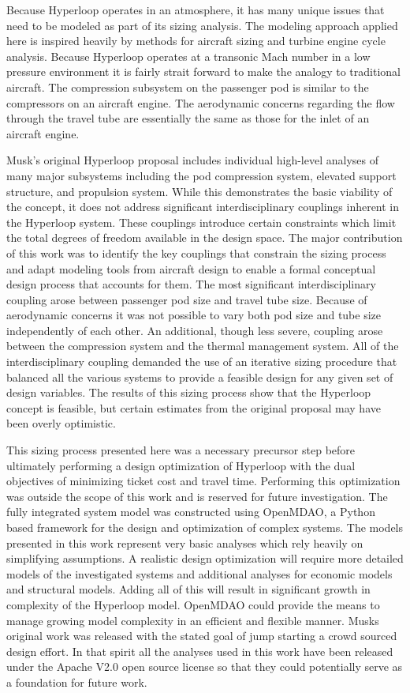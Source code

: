 \documentclass[heading.tex]{subfiles}
\begin{document}
Because Hyperloop operates in an atmosphere, it has many unique issues that need to be modeled as part of its sizing analysis. 
The modeling approach applied here is inspired heavily by methods for aircraft sizing and turbine engine cycle analysis. Because Hyperloop 
operates at a transonic Mach number in a low pressure environment it is fairly strait forward to make the analogy to traditional aircraft. 
The compression subsystem on the passenger pod is similar to the compressors on an aircraft engine. The aerodynamic concerns  
regarding the flow through the travel tube are essentially the same as those for the inlet of an aircraft engine. 

Musk’s original Hyperloop proposal includes individual high-level analyses of many major subsystems including the pod compression system,
elevated support structure, and propulsion system. While this demonstrates the basic viability of the concept, it does not address
significant interdisciplinary couplings inherent in the Hyperloop system. These couplings introduce certain constraints which limit the total 
degrees of freedom available in the design space. The major contribution of this work was to identify the key couplings that constrain the sizing 
process and adapt modeling tools from aircraft design to enable a formal conceptual design process that accounts for them. The most significant 
interdisciplinary coupling arose between passenger pod size and travel tube size. Because of aerodynamic concerns it was not possible to vary 
both pod size and tube size independently of each other. An additional, though less severe, coupling arose between the compression system and 
the thermal management system. All of the interdisciplinary coupling demanded the use of an iterative sizing procedure that balanced 
all the various systems to provide a feasible design for any given set of design variables. The results of this sizing process show that
the Hyperloop concept is feasible, but certain estimates from the original proposal may have been overly optimistic. 

This sizing process presented here was a necessary precursor step before ultimately performing a design optimization of 
Hyperloop with the dual objectives of minimizing ticket cost and travel time. Performing this optimization 
was outside the scope of this work and is reserved for future investigation. 
The fully integrated system model was constructed using OpenMDAO, a Python based framework for 
the design and optimization of complex systems\cite{GrayBenmarking2013}. The models presented 
in this work represent very basic analyses which rely heavily on simplifying assumptions. A realistic design 
optimization will require more detailed models of the investigated systems and additional analyses for economic models and 
structural models. Adding all of this will result in significant growth in complexity of the Hyperloop model. 
OpenMDAO could provide the means to manage growing model complexity 
in an efficient and flexible manner. Musks original work was released with the stated goal of jump starting
a crowd sourced design effort. In that spirit all the analyses used in this work have been released under
the Apache V2.0 open source license so that they could potentially serve as a foundation for future work.
\end{document}
